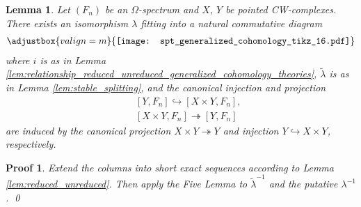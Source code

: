 \documentclass[sort&compress]{elsarticle}
\theoremstyle{theoremstyle}
\newtheorem{lem}[nul]{Lemma}
\theoremstyle{framedtheoremstyle}
\theoremstyle{definitionstyle}
\theoremstyle{definitionstyle}
\theoremstyle{definitionstyle}
\theoremstyle{definitionstyle}
\theoremstyle{nameddefinitionstyle}
\theoremstyle{framednameddefinitionstyle}
\theoremstyle{proofstyle}
\newtheorem{pf}{Proof}
\theoremstyle{definitionstyle}
\newcommand{\oneone}{\hookrightarrow}
\newcommand{\onto}{\twoheadrightarrow}
\newcommand{\ZZZ}{\mathbb{Z}}
\DeclareMathOperator{\identity}{id}
\newcommand{\isomorphic}{\cong}
\newcommand{\paren}[1]{\left( #1 \right)}
\newcommand{\angles}[1]{\left\langle #1 \right\rangle}
\newcommand{\brackets}[1]{\left[ #1 \right]}
\begin{document}
\begin{appendices}
\begin{lem}\label{lem:stable_splitting_2}
Let $\paren{F_n}$ be an $\Omega$-spectrum and $X$, $Y$ be pointed CW-complexes.
There exists an isomorphism $\lambda$ fitting into a natural commutative diagram
\begin{eqnarray}
\adjustbox{valign=m}{\texttt{[image: spt\_generalized\_cohomology\_tikz\_16.pdf]}}
\end{eqnarray}
where $i$ is as in Lemma \ref{lem:relationship_reduced_unreduced_generalized_cohomology_theories}, $\tilde \lambda$ is as in Lemma \ref{lem:stable_splitting}, and the canonical injection and projection
\begin{eqnarray}
&& \brackets{Y, F_n} \oneone \brackets{X \times Y, F_n}, \\
&& \brackets{X \times Y, F_n} \onto \brackets{Y, F_n} 
\end{eqnarray}
are induced by the canonical projection $X \times Y \onto Y$ and injection $Y \oneone X \times Y$, respectively.
\end{lem}

\begin{pf}
Extend the columns into short exact sequences according to Lemma \ref{lem:reduced_unreduced}. Then apply the Five Lemma to $\tilde \lambda^{-1}$ and the putative $\lambda^{-1}$.
\qed\end{pf}












\end{appendices}
\end{document}
